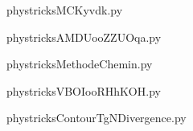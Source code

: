     

    \clearpage
    


    \newcommand{\CaptionFigMCKyvdk}{<+Type your caption here+>}
    \begin{center}
        
    \end{center}
    phystricksMCKyvdk.py

    

    \clearpage
    


    \newcommand{\CaptionFigAMDUooZZUOqa}{<+Type your caption here+>}
    \begin{center}
        
    \end{center}
    phystricksAMDUooZZUOqa.py

    

    \clearpage
    


    \newcommand{\CaptionFigMethodeChemin}{<+Type your caption here+>}
    \begin{center}
        
    \end{center}
    phystricksMethodeChemin.py

    

    \clearpage
    


    \newcommand{\CaptionFigVBOIooRHhKOH}{<+Type your caption here+>}
    \begin{center}
        
    \end{center}
    phystricksVBOIooRHhKOH.py

    

    \clearpage
    


    \newcommand{\CaptionFigContourTgNDivergence}{<+Type your caption here+>}
    \begin{center}
        
    \end{center}
    phystricksContourTgNDivergence.py

    

    \clearpage
    


